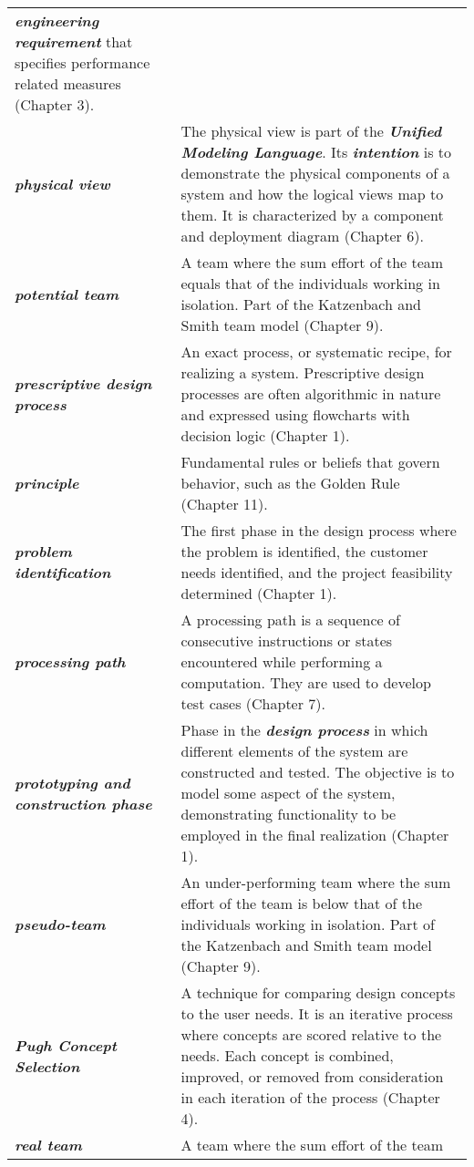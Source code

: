 \begin{longtable}[]{@{}
  >{\raggedright\arraybackslash}p{}
  >{\raggedright\arraybackslash}p{}@{}}
\emph{\textbf{engineering requirement}} that specifies performance
related measures (Chapter 3). \\
\emph{\textbf{physical view}} & The physical view is part of the
\emph{\textbf{Unified Modeling Language}}. Its \emph{\textbf{intention}}
is to demonstrate the physical components of a system and how the
logical views map to them. It is characterized by a component and
deployment diagram (Chapter 6). \\
\emph{\textbf{potential team}} & A team where the sum effort of the team
equals that of the individuals working in isolation. Part of the
Katzenbach and Smith team model (Chapter 9). \\
\emph{\textbf{prescriptive design process}} & An exact process, or
systematic recipe, for realizing a system. Prescriptive design processes
are often algorithmic in nature and expressed using flowcharts with
decision logic (Chapter 1). \\
\emph{\textbf{principle}} & Fundamental rules or beliefs that govern
behavior, such as the Golden Rule (Chapter 11). \\
\emph{\textbf{problem identification}} & The first phase in the design
process where the problem is identified, the customer needs identified,
and the project feasibility determined (Chapter 1). \\
\emph{\textbf{processing path}} & A processing path is a sequence of
consecutive instructions or states encountered while performing a
computation. They are used to develop test cases (Chapter 7). \\
\emph{\textbf{prototyping and construction phase}} & Phase in the
\emph{\textbf{design process}} in which different elements of the system
are constructed and tested. The objective is to model some aspect of the
system, demonstrating functionality to be employed in the final
realization (Chapter 1). \\
\emph{\textbf{pseudo-team}} & An under-performing team where the sum
effort of the team is below that of the individuals working in
isolation. Part of the Katzenbach and Smith team model (Chapter 9). \\
\emph{\textbf{Pugh Concept Selection}} & A technique for comparing
design concepts to the user needs. It is an iterative process where
concepts are scored relative to the needs. Each concept is combined,
improved, or removed from consideration in each iteration of the process
(Chapter 4). \\
\emph{\textbf{real team}} & A team where the sum effort of the team

\end{longtable}
